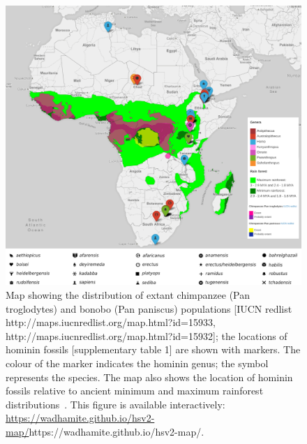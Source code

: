 \documentclass[fleqn,10pt]{wlscirep}
\begin{document}
\begin{figure}
  \centering
  \includegraphics[width=\textwidth]{figs/chimpanzee-rainforest}
  \caption{
  	Map showing the distribution of extant chimpanzee (Pan troglodytes) and bonobo (Pan paniscus) populations [IUCN redlist http://maps.iucnredlist.org/map.html?id=15933, http://maps.iucnredlist.org/map.html?id=15932]; the locations of hominin fossils [supplementary table 1] are shown with markers. The colour of the marker indicates the hominin genus; the symbol represents the species. The map also shows the location of hominin fossils relative to ancient minimum and maximum rainforest distributions~\citep{Peel2007}. This figure is available interactively: \url{https://wadhamite.github.io/hsv2-map/}{https://wadhamite.github.io/hsv2-map/}.}
  \label{fig:chimpanzee-rainforest}
\end{figure}
\end{document}
